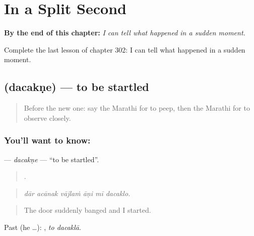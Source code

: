 
\chapter{In a Split Second}
\label{ch:mr-in-a-split-second}

\begin{chapteropening}
\textbf{By the end of this chapter:} \emph{I can tell what happened in a sudden moment.}

Complete the last lesson of chapter 302: I can tell what happened in a sudden moment.
\end{chapteropening}

\section[\texorpdfstring{\mr{दचकणे} (dacakṇe)}{दचकणे (dacakṇe)}]{ (dacakṇe) — to be startled}

\label{lesson:MR-C302-dacakne}



\begin{quote}
Before the new one: say the Marathi for to peep, then the Marathi for to observe closely.
\end{quote}

\subsection*{You'll want to know: }
\textbf{} — \emph{dacakṇe} — \textquotedblleft{}to be startled\textquotedblright{}.

\begin{quote}
     .
\end{quote}

\begin{quote}
\emph{dār acānak vājlaṁ āṇi mī dacaklo.}
\end{quote}

\begin{quote}
The door suddenly banged and I started.
\end{quote}

Past (he …):  , \emph{to dacaklā}.

